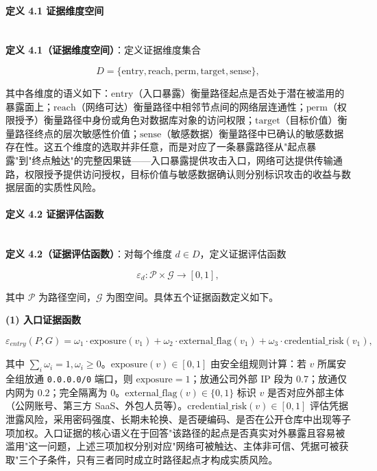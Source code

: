 \documentclass[a4paper,12pt]{ctexart}
\begin{document}
\paragraph{定义 4.1 证据维度空间}\mbox{}\\

\textbf{定义 4.1（证据维度空间）}：定义证据维度集合

\[
D = \{\text{entry}, \text{reach}, \text{perm}, \text{target}, \text{sense}\},
\]

其中各维度的语义如下：$\text{entry}$（入口暴露）衡量路径起点是否处于潜在被滥用的暴露面上；$\text{reach}$（网络可达）衡量路径中相邻节点间的网络层连通性；$\text{perm}$（权限授予）衡量路径中身份或角色对数据库对象的访问权限；$\text{target}$（目标价值）衡量路径终点的层次敏感性价值；$\text{sense}$（敏感数据）衡量路径中已确认的敏感数据存在性。这五个维度的选取并非任意，而是对应了一条暴露路径从"起点暴露"到"终点触达"的完整因果链——入口暴露提供攻击入口，网络可达提供传输通路，权限授予提供访问授权，目标价值与敏感数据确认则分别标识攻击的收益与数据层面的实质性风险。

\paragraph{定义 4.2 证据评估函数}\mbox{}\\

\textbf{定义 4.2（证据评估函数）}：对每个维度 $d \in D$，定义证据评估函数

\[
\varepsilon_d : \mathcal{P} \times \mathcal{G} \to [0, 1],
\]

其中 $\mathcal{P}$ 为路径空间，$\mathcal{G}$ 为图空间。具体五个证据函数定义如下。

\textbf{(1) 入口证据函数}

\[
\varepsilon_{entry}(P, G) = \omega_1 \cdot \text{exposure}(v_1) + \omega_2 \cdot \text{external\_flag}(v_1) + \omega_3 \cdot \text{credential\_risk}(v_1),
\]

其中 $\sum_i \omega_i = 1, \omega_i \geq 0$。$\text{exposure}(v) \in [0,1]$ 由安全组规则计算：若 $v$ 所属安全组放通 \texttt{0.0.0.0/0} 端口，则 $\text{exposure}=1$；放通公司外部 IP 段为 $0.7$；放通仅内网为 $0.2$；完全隔离为 $0$。$\text{external\_flag}(v) \in \{0,1\}$ 标识 $v$ 是否对应外部主体（公网账号、第三方 SaaS、外包人员等）。$\text{credential\_risk}(v) \in [0,1]$ 评估凭据泄露风险，采用密码强度、长期未轮换、是否硬编码、是否在公开仓库中出现等子项加权。入口证据的核心语义在于回答"该路径的起点是否真实对外暴露且容易被滥用"这一问题，上述三项加权分别对应"网络可被触达、主体非可信、凭据可被获取"三个子条件，只有三者同时成立时路径起点才构成实质风险。
\end{document}
